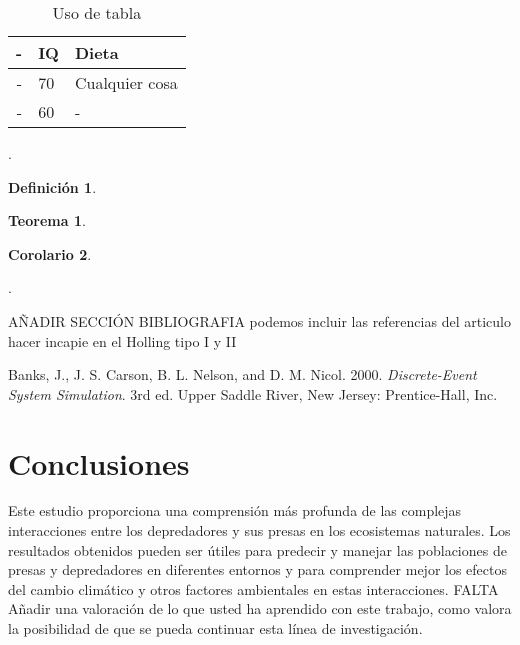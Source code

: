 \documentclass{wscpaperproc}
\theoremstyle{wsc}
\newtheorem{theorem}{Teorema}
\newtheorem{corollary}[theorem]{Corolario}
\newtheorem{definition}{Definici\'on}
\begin{document}
\begin{table}[htb]
\centering
\caption{Uso de tabla\label{tab: first}}
\begin{tabular}{rll}
\hline
-& IQ & Dieta\\ \hline
- & 70 & Cualquier cosa\\
- & 60 &- \\
\hline
\end{tabular}
\end{table}


.
\begin{definition}

\end{definition}

\begin{theorem}

\end{theorem}

\begin{corollary}

\end{corollary}

.



{\footnotesize
\begin{hangref}
\item AÑADIR SECCIÓN BIBLIOGRAFIA podemos incluir las referencias del articulo hacer incapie en el Holling tipo I y II
\item Banks, J., J. S. Carson, B. L. Nelson, and D. M. Nicol. 2000. \textit{Discrete-Event System Simulation}. 3rd ed. Upper Saddle River, New Jersey: Prentice-Hall, Inc.
\end{hangref}
}









\section*{Conclusiones}
Este estudio proporciona una comprensi\'on más profunda de las complejas interacciones entre los depredadores y sus presas en 
los ecosistemas naturales. Los resultados obtenidos pueden ser \'utiles para predecir y manejar las poblaciones de presas y 
depredadores en diferentes entornos y para comprender mejor los efectos del cambio clim\'atico y otros factores ambientales 
en estas interacciones. FALTA Añadir una valoración de lo que usted ha aprendido con este trabajo, como valora la
posibilidad de que se pueda continuar esta línea de investigación.
\end{document}
